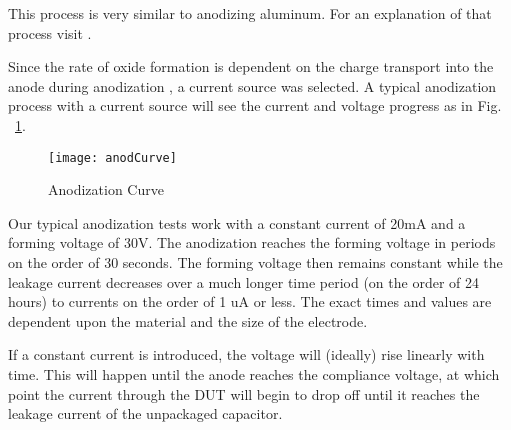 This process is very similar to anodizing aluminum. For an explanation of that process visit \cite{cwruEncAlanod}.

Since the rate of oxide formation is dependent on the charge transport into the anode during anodization \cite{tiMinit}, a current source was selected. A typical anodization process with a current source will see the current and voltage progress as in Fig. ~\ref{fig:anodCurve}.

\begin{figure}[here]
\centering
\texttt{[image: anodCurve]}
\caption{Anodization Curve \cite{tiMinit}}
\label{fig:anodCurve}
\end{figure}

Our typical anodization tests work with a constant current of 20mA and a forming voltage of 30V. The anodization reaches the forming voltage in periods on the order of 30 seconds. The forming voltage then remains constant while the leakage current decreases over  a much longer time period (on the order of 24 hours) to currents on the order of 1 uA or less. The exact times and values are dependent upon the material and the size of the electrode.

If a constant current is introduced, the voltage will (ideally) rise linearly with time. This will happen until the anode reaches the compliance voltage, at which point the current through the DUT will begin to drop off until it reaches the leakage current of the unpackaged capacitor. 
